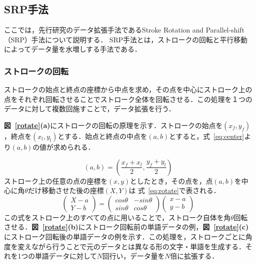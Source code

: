 \subsection{SRP手法}
ここでは，先行研究\cite{takahashi}のデータ拡張手法であるStroke Rotation and Parallel-shift（SRP）手法について説明する．
SRP手法とは，ストロークの回転と平行移動によってデータ量を水増しする手法である．
\subsubsection{ストロークの回転}
ストロークの始点と終点の座標から中点を求め，その点を中心にストローク上の点をそれぞれ回転させることでストローク全体を回転させる．この処理を１つのデータに対して複数回施すことで，データ拡張を行う．

\textbf{図~\ref{rotate}(a)}にストロークの回転の原理を示す．ストロークの始点を$(x_f, y_f)$，終点を$(x_l, y_l)$とする．始点と終点の中点を$(a, b)$とすると，式~\ref{eq:center}より$(a, b)$の値が求められる．

\begin{equation}
  (a, b) = (\frac{x_f+x_l}{2}, \frac{y_f+y_l}{2})
  \label{eq:center}
\end{equation}
ストローク上の任意の点の座標を$(x, y)$としたとき，その点を，点$(a, b)$を中心に角$\theta$だけ移動させた後の座標$(X, Y)$は 式~\ref{eq:rotate}で表される．
\begin{equation}
  \left(
    \begin{array}{r}
        X-a \\
        Y-b
    \end{array}
    \right)
 = \left(
  \begin{array}{rr}
      cos\theta & -sin\theta \\
      sin\theta & cos\theta
  \end{array}
  \right)
  \left(
    \begin{array}{r}
        x-a \\
        y-b
    \end{array}
    \right)
  \label{eq:rotate}
\end{equation}
この式をストローク上のすべての点に用いることで，ストローク自体を角$\theta$回転させる．\textbf{図~\ref{rotate}(b)}にストローク回転前の単語データの例，\textbf{図~\ref{rotate}(c)}にストローク回転後の単語データの例を示す．この処理を，ストロークごとに角度を変えながら行うことで元のデータとは異なる形の文字・単語を生成する．それを1つの単語データに対して$N$回行い，データ量を$N$倍に拡張する．

